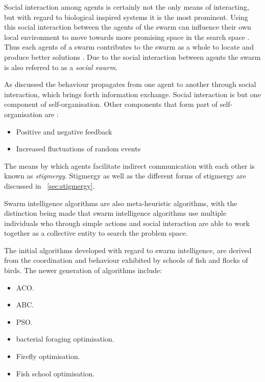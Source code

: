 Social interaction among agents is certainly not the only means of interacting, but with regard to biological inspired systems it is the most prominent\cite{CompuIntelligenceIntro}.
Using this social interaction between the agents of the swarm can influence their own local environment to move towards more promising space in the search space \cite{ChaoticSwarmIntel,CompuIntelligenceIntro}. Thus each agents of a swarm contributes to the swarm as a whole to locate and produce better solutions \cite{BeeJobShop}. Due to the social interaction between agents the swarm is also referred to as a \emph{social swarm}\cite{ChaoticSwarmIntel,FundamentalSwarm}.

As discussed the behaviour propagates from one agent to another through social interaction, which brings forth information exchange\cite{SwarmArt}. Social interaction is but one component of self-organisation. Other components that form part of self-organisation are \cite{SIPowerInNums}:
\begin{itemize}
\item Positive and negative feedback\cite{SIPowerInNums}
\item Increased fluctuations of random events\cite{SIPowerInNums}
\end{itemize}

The means by which agents facilitate indirect communication with each other is known as \emph{stigmergy}. Stigmergy as well as the different forms of stigmergy are discussed in ~\ref{sec:stigmergy}.

Swarm intelligence algorithms are also meta-heuristic algorithms, with the distinction being made that swarm intelligence algorithms use multiple individuals who through simple actions and social interaction are able to work together as a collective entity to search the problem space\cite{SwarmArt,ChaoticSwarmIntel,BeeJobShop,CompuIntelligenceIntro,FundamentalSwarm}.

The initial algorithms developed with regard to swarm intelligence,  are derived from the coordination and behaviour exhibited by schools of fish and flocks of birds. The newer generation of algorithms include\cite{SwarmArt,ChaoticSwarmIntel,BeeJobShop}:
\begin{itemize}
\item \gls{ACO}\cite{SwarmArt}.
\item \gls{ABC}\cite{BeeJobShop}.
\item \gls{PSO}\cite{ChaoticSwarmIntel}. 
\item bacterial foraging optimisation\cite{CompuIntelligenceIntro}.
\item Firefly optimisation\cite{CompuIntelligenceIntro}.
\item Fish school optimisation\cite{CompuIntelligenceIntro}.
\end{itemize}


